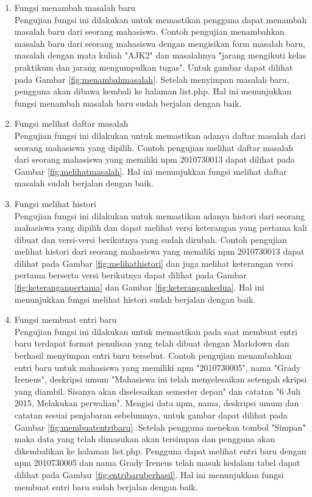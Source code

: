 \begin{enumerate}[(1)]
\item Fungsi menambah masalah baru\\
    Pengujian fungsi ini dilakukan untuk memastikan pengguna dapat menambah masalah baru dari seorang mahasiswa. Contoh pengujian menambahkan masalah baru dari seorang mahasiswa dengan mengisikan form masalah baru, masalah dengan mata kuliah "AJK2" dan masalahnya "jarang mengikuti kelas praktikum dan jarang mengumpulkan tugas". Untuk gambar dapat dilihat pada Gambar \ref{fig:menambahmasalah}. Setelah menyimpan masalah baru, pengguna akan dibawa kembali ke halaman list.php. Hal ini menunjukkan fungsi menambah masalah baru sudah berjalan dengan baik.

\item Fungsi melihat daftar masalah\\
    Pengujian fungsi ini dilakukan untuk memastikan adanya daftar masalah dari seorang mahasiswa yang dipilih. Contoh pengujian melihat daftar masalah dari seorang mahasiswa yang memiliki npm 2010730013 dapat dilihat pada Gambar \ref{fig:melihatmasalah}. Hal ini menunjukkan fungsi melihat daftar masalah sudah berjalan dengan baik.

\item Fungsi melihat histori\\
	Pengujian fungsi ini dilakukan untuk memastikan adanya histori dari seorang mahasiswa yang dipilih dan dapat melihat versi keterangan yang pertama kali dibuat dan versi-versi berikutnya yang sudah dirubah. Contoh pengujian melihat histori dari seorang mahasiswa yang memiliki npm 2010730013 dapat dilihat pada Gambar \ref{fig:melihathistori} dan juga melihat keterangan versi pertama berserta versi berikutnya dapat dilihat pada Gambar \ref{fig:keteranganpertama} dan Gambar \ref{fig:keterangankedua}. Hal ini menunjukkan fungsi melihat histori sudah berjalan dengan baik.
	
\item Fungsi membuat entri baru\\
	Pengujian fungsi ini dilakukan untuk memastikan pada saat membuat entri baru terdapat format penulisan yang telah dibuat dengan Markdown dan berhasil menyimpan entri baru tersebut. Contoh pengujian menambahkan entri baru untuk mahasiswa yang memiliki npm "2010730005", nama "Grady Ireneus", deskripsi umum "Mahasiswa ini telah menyelesaikan setengah skripsi yang diambil. Sisanya akan diselesaikan semester depan" dan catatan "6 Juli 2015, Melakukan perwalian". Mengisi data npm, nama, deskripsi umum dan catatan sesuai penjabaran sebelumnya, untuk gambar dapat dilihat pada Gambar \ref{fig:membuatentribaru}. Setelah pengguna menekan tombol "Simpan" maka data yang telah dimasukan akan tersimpan dan pengguna akan dikembalikan ke halaman list.php. Pengguna dapat melihat entri baru dengan npm 2010730005 dan nama Grady Ireneus telah masuk kedalam tabel dapat dilihat pada Gambar \ref{fig:entribaruberhasil}. Hal ini menunjukkan fungsi membuat entri baru sudah berjalan dengan baik.
	

\end{enumerate}
